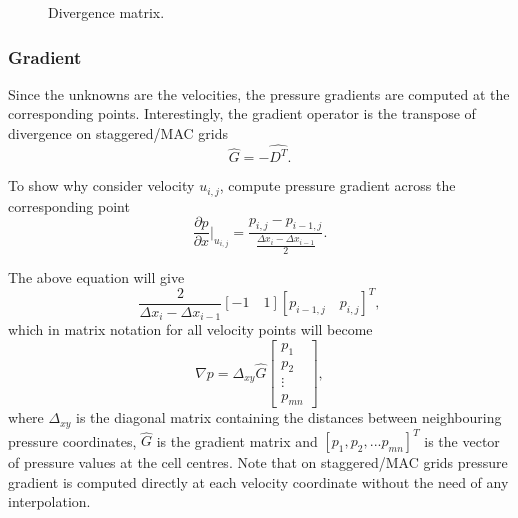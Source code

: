 \documentclass{article}
\begin{document}
\begin{figure}[hbt] %
  \caption{Divergence matrix.}\label{fig:divergence-matrix}
\end{figure}

\subsubsection{Gradient}\label{subsec:gradient}

Since the unknowns are the velocities, the pressure gradients are computed at the corresponding points. Interestingly, the gradient operator is the transpose of divergence on staggered/MAC grids
\begin{equation}
  \hat{G}=-\hat{D^T}.
\end{equation}

To show why consider velocity $u_{i,j}$, compute pressure gradient across the corresponding point
\begin{equation}
	\frac{\partial p}{\partial x}\bigg|_{u_{i,j}} = \frac{p_{i,j}-p_{i-1,j}}{\frac{\Delta x_i- \Delta x_{i-1}}{2}}.
\end{equation}

The above equation will give 
\begin{equation}
  \frac{2}{\Delta x_i- \Delta x_{i-1}}[-1 \quad 1][p_{i-1,j} \quad p_{i,j}]^T,
\end{equation}
which in matrix notation for all velocity points will become 
\begin{equation}
  \nabla p = \Delta_{xy}\hat{G} 
  \begin{bmatrix}{}
  p_1 \\
  p_2 \\
  \vdots \\
  p_{mn}
\end{bmatrix},
\end{equation}
where $\Delta_{xy}$ is the diagonal matrix containing the distances between neighbouring pressure coordinates, $\hat{G}$ is the gradient matrix and $[p_1,p_2,...p_{mn}]^T$ is the vector of pressure values at the cell centres. Note that on staggered/MAC grids pressure gradient is computed directly at each velocity coordinate without the need of any interpolation. 
\end{document}
